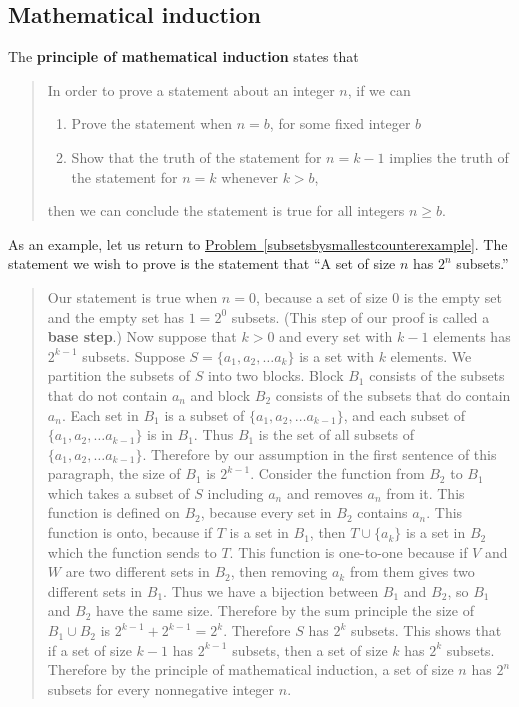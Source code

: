 \documentclass[10pt,]{book}
\newcommand{\terminology}[1]{\textbf{#1}}
\theoremstyle{plain}
\theoremstyle{definition}
\theoremstyle{definition}
\numberwithin{equation}{chapter}
\begin{document}
\subsection[{Mathematical induction}]{Mathematical induction}\label{subsection-74}
The \terminology{principle of mathematical induction} states that%
\begin{quote}\hypertarget{blockquote-17}{}
In order to prove a statement about an integer \(n\), if we can \leavevmode%
\begin{enumerate}
\item\hypertarget{li-129}{}Prove the statement when \(n=b\), for some fixed integer \(b\)%
\item\hypertarget{li-130}{}Show that the truth of the statement for \(n=k-1\) implies the truth of the statement for \(n=k\) whenever \(k>b\),%
\end{enumerate}
 then we can conclude the statement is true for all integers \(n\ge
b\).%
\end{quote}
As an example, let us return to \hyperref[subsetsbysmallestcounterexample]{Problem~\ref{subsetsbysmallestcounterexample}}. The statement we wish to prove is the statement that ``A set of size \(n\) has \(2^n\) subsets.''%
\begin{quote}\hypertarget{blockquote-18}{}
Our statement is true when \(n=0\), because a set of size 0 is the empty set and the empty set has \(1=2^0\) subsets. (This step of our proof is called a \terminology{base step}.) Now suppose that \(k>0\) and every set with \(k-1\) elements has \(2^{k-1}\) subsets.  Suppose \(S=\{a_1,a_2,\ldots a_k\}\) is a set with \(k\) elements. We partition the subsets of \(S\) into two blocks.  Block \(B_1\) consists of the subsets that do not contain \(a_n\) and block \(B_2\) consists of the subsets that do contain \(a_n\).  Each set in \(B_1\) is a subset of \(\{a_1,a_2,\ldots a_{k-1}\}\), and each subset of \(\{a_1,a_2, \ldots
a_{k-1}\}\) is in \(B_1\).  Thus \(B_1\) is the set of all subsets of \(\{a_1,a_2,\ldots a_{k-1}\}\).  Therefore by our assumption in the first sentence of this paragraph, the size of \(B_1\) is \(2^{k-1}\).  Consider the function from \(B_2\) to \(B_1\) which takes a subset of \(S\) including \(a_n\) and removes \(a_n\) from it.  This function is defined on \(B_2\), because every set in \(B_2\) contains \(a_n\).  This function is onto, because if \(T\) is a set in \(B_1\), then \(T\cup \{a_k\}\) is a set in \(B_2\) which the function sends to \(T\).  This function is one-to-one because if \(V\) and \(W\) are two different sets in \(B_2\), then removing \(a_k\) from them gives two different sets in \(B_1\).  Thus we have a bijection between \(B_1\) and \(B_2\), so \(B_1\) and \(B_2\) have the same size.  Therefore by the sum principle the size of \(B_1\cup B_2\) is \(2^{k-1} +2^{k-1}=2^k\).  Therefore \(S\) has \(2^k\) subsets.  This shows that if a set of size \(k-1\) has \(2^{k-1}\) subsets, then a set of size \(k\) has \(2^k\) subsets.  Therefore by the principle of mathematical induction, a set of size \(n\) has \(2^n\) subsets for every nonnegative integer \(n\).%
\end{quote}
\end{document}
